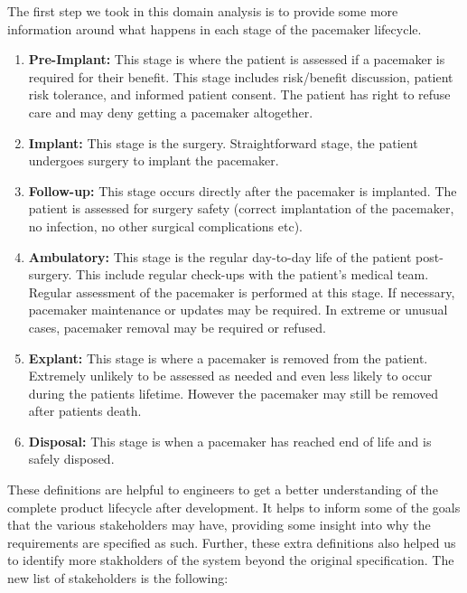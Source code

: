 
The first step we took in this domain analysis is to provide some more information around what happens in each stage of the pacemaker lifecycle.

\begin{enumerate}
	\item \textbf{Pre-Implant:} This stage is where the patient is assessed if a pacemaker is required for their benefit. This stage includes risk/benefit discussion, patient risk tolerance, and informed patient consent. The patient has right to refuse care and may deny getting a pacemaker altogether. 
	\item \textbf{Implant:} This stage is the surgery. Straightforward stage, the patient undergoes surgery to implant the pacemaker.
	\item \textbf{Follow-up:} This stage occurs directly after the pacemaker is implanted. The patient is assessed for surgery safety (correct implantation of the pacemaker, no infection, no other surgical complications etc).
	\item \textbf{Ambulatory:} This stage is the regular day-to-day life of the patient post-surgery. This include regular check-ups with the patient's medical team. Regular assessment of the pacemaker is performed at this stage. If necessary, pacemaker maintenance or updates may be required. In extreme or unusual cases, pacemaker removal may be required or refused.
	\item \textbf{Explant:} This stage is where a pacemaker is removed from the patient. Extremely unlikely to be assessed as needed and even less likely to occur during the patients lifetime. However the pacemaker may still be removed after patients death.
	\item \textbf{Disposal:} This stage is when a pacemaker has reached end of life and is safely disposed.
\end{enumerate}

These definitions are helpful to engineers to get a better understanding of the complete product lifecycle after development. It helps to inform some of the goals that the various stakeholders may have, providing some insight into why the requirements are specified as such. Further, these extra definitions also helped us to identify more stakholders of the system beyond the original specification. The new list of stakeholders is the following:

